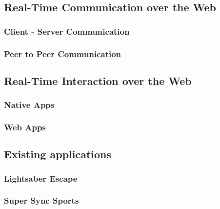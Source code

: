 \subsection{Real-Time Communication over the Web} %

\subsubsection{Client - Server Communication} %

\subsubsection{Peer to Peer Communication} %


\subsection{Real-Time Interaction over the Web} %

\subsubsection{Native Apps}

\subsubsection{Web Apps}

\subsection{Existing applications}

\subsubsection{Lightsaber Escape} %

\subsubsection{Super Sync Sports} %



\clearpage
